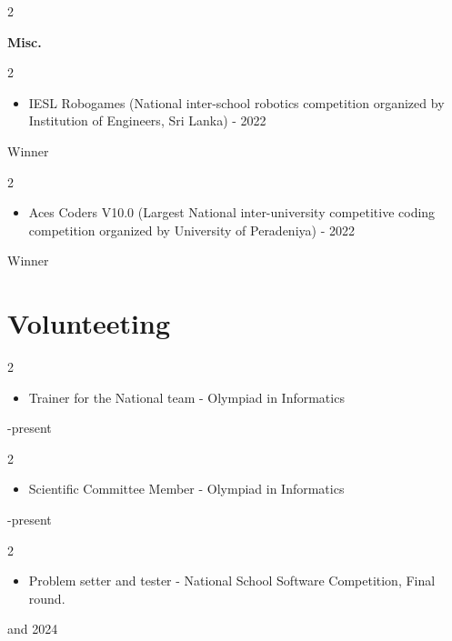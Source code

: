 \documentclass[10pt, letterpaper]{article}
\newenvironment{highlights}{
    \begin{itemize}[
        topsep=0.10 cm,
        parsep=0.10 cm,
        partopsep=0pt,
        itemsep=0pt,
        leftmargin=0 cm + 10pt
    ]
}{
    \end{itemize}
} %
\newenvironment{twocolentry}[2][]{
    \onecolentry
    \def\secondColumn{#2}
    \setcolumnwidth{\fill, 6.5 cm}
    \begin{paracol}{2}
}{
    \switchcolumn \raggedleft \secondColumn
    \end{paracol}
    \endonecolentry
} %
\begin{document}
\vspace{0.20 cm}
\begin{twocolentry}{
        }
    \textbf{Misc.}
\end{twocolentry}

\vspace{0.10 cm}
\begin{twocolentry} {
    Winner
}
    \begin{highlights}
        \item IESL Robogames (National inter-school robotics competition organized by Institution of Engineers, Sri Lanka) - 2022
    \end{highlights}
\end{twocolentry}

\begin{twocolentry} {
    Winner
}
    \begin{highlights}
        \item Aces Coders V10.0 (Largest National inter-university competitive coding competition organized by University of Peradeniya) - 2022
    \end{highlights}
\end{twocolentry}

\section{Volunteeting}



        
        \begin{twocolentry} {
    2022-present
}
    \begin{highlights}
        \item Trainer for the National team - Olympiad in Informatics
    \end{highlights}
\end{twocolentry}

        \begin{twocolentry} {
    2022-present
}
    \begin{highlights}
        \item Scientific Committee Member - Olympiad in Informatics
    \end{highlights}
\end{twocolentry}

\begin{twocolentry} {
    2023 and 2024
}
    \begin{highlights}
        \item Problem setter and tester - National School Software Competition, Final round.
    \end{highlights}
\end{twocolentry}
\end{document}
